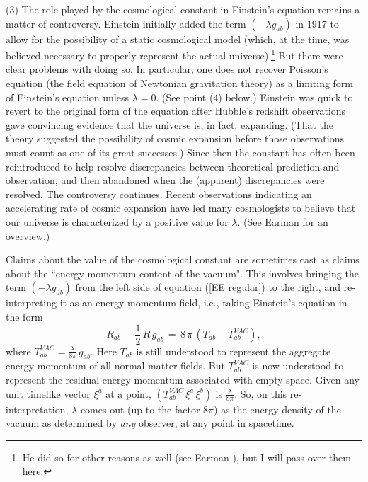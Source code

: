 \documentclass [12] {article}
\theoremstyle{plain}
\numberwithin{figure}{subsection}
\numberwithin{proposition}{subsection}
\begin{document}
(3) The role played by the cosmological constant in Einstein's equation remains a matter of controversy. Einstein initially added the term $(-\lambda g_{ab})$ in 1917 to allow for the possibility of a static cosmological model (which, at the time, was believed necessary to properly represent the actual universe).\footnote{He did so for other reasons as well (see Earman ), but I will pass over them here.} But there were clear problems with doing so. In particular, one does not recover Poisson's equation (the field equation of Newtonian gravitation theory) as a limiting form of Einstein's equation unless $\lambda = 0$. (See point (4) below.) Einstein was quick to revert to the original form of the  equation after Hubble's redshift observations gave convincing evidence that the universe is, in fact, expanding. (That the theory suggested the possibility of cosmic expansion before those observations must count as one of its great successes.) Since then the constant has often been reintroduced to help resolve discrepancies between theoretical prediction and observation, and then abandoned when the (apparent) discrepancies were resolved.  The controversy continues.  Recent observations indicating an accelerating rate of cosmic expansion have led many cosmologists to believe that our universe is characterized by a positive value for $\lambda$. (See Earman  for an overview.) 

Claims about the value of the cosmological constant are sometimes cast as claims about the ``energy-momentum content of the vacuum".  This involves bringing the term $(-\lambda g_{ab})$ from the left side of equation (\ref{EE regular}) to the right, and re-interpreting it as an energy-momentum field, i.e., taking Einstein's equation in the form
%
\begin{equation}\label{EE-vacuum}
R_{ab} \,  - \frac{1}{2} \, R \, g_{ab}   \,  = \,  8 \, \pi \, (T_{ab} +  T^{VAC}_{ab}), 
\end{equation}     
% 
where  $ \displaystyle  T^{VAC}_{ab} = \frac{\lambda}{8 \pi} \, g_{ab}$. Here $T_{ab}$ is still understood to represent the aggregate energy-momentum of all normal matter fields. But  $T^{VAC}_{ab}$ is now understood to represent the residual energy-momentum associated with empty space.   Given any unit timelike vector $\xi^a$ at a point, $(T^{VAC}_{ab}\, \xi^a \, \xi^b)$ is $\displaystyle \frac{\lambda}{8 \pi}$.  So, on this re-interpretation, $\lambda$  comes out (up to the factor $8 \pi$) as the energy-density of the vacuum as determined by \emph{any} observer, at {any} point in spacetime. 
\end{document}
